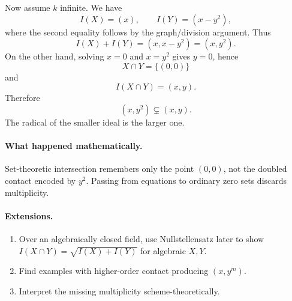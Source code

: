 Now assume \(k\) infinite.  We have
\[
I(X)=(x),
\qquad
I(Y)=(x-y^2),
\]
where the second equality follows by the graph/division argument.  Thus
\[
I(X)+I(Y)=(x,x-y^2)=(x,y^2).
\]
On the other hand, solving \(x=0\) and \(x=y^2\) gives \(y=0\), hence
\[
X\cap Y=\{(0,0)\}
\]
and
\[
I(X\cap Y)=(x,y).
\]
Therefore
\[
(x,y^2)\subsetneq(x,y).
\]
The radical of the smaller ideal is the larger one.

\paragraph{What happened mathematically.}
Set-theoretic intersection remembers only the point \((0,0)\), not the doubled contact
encoded by \(y^2\).  Passing from equations to ordinary zero sets discards multiplicity.

\paragraph{Extensions.}
\begin{enumerate}
\item Over an algebraically closed field, use Nullstellensatz later to show
      \(I(X\cap Y)=\sqrt{I(X)+I(Y)}\) for algebraic \(X,Y\).
\item Find examples with higher-order contact producing \((x,y^m)\).
\item Interpret the missing multiplicity scheme-theoretically.
\end{enumerate}
\fi
